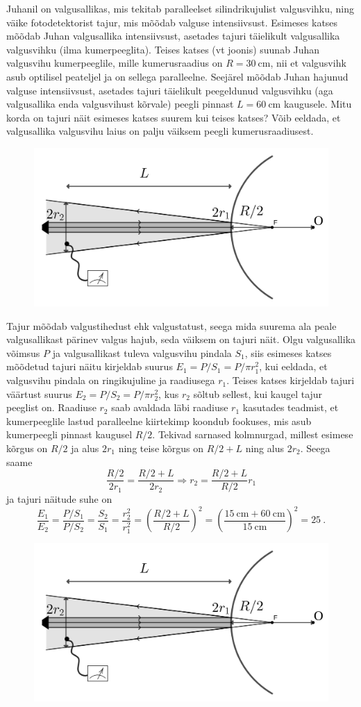 
Juhanil on valgusallikas, mis tekitab paralleelset silindrikujulist valgusvihku, ning väike fotodetektorist tajur, mis mõõdab valguse intensiivsust. Esimeses katses mõõdab Juhan valgusallika intensiivsust, asetades tajuri täielikult valgusallika valgusvihku (ilma kumerpeeglita). Teises katses (vt joonis) suunab Juhan valgusvihu kumerpeeglile, mille kumerusraadius on $R=\SI{30}{\centi\m}$, nii et valgusvihk asub optilisel peateljel ja on sellega paralleelne. Seejärel mõõdab Juhan hajunud valguse intensiivsust, asetades tajuri täielikult peegeldunud valgusvihku (aga valgusallika enda valgusvihust kõrvale) peegli pinnast $L=\SI{60}{\centi\m}$ kaugusele. Mitu korda on tajuri näit esimeses katses suurem kui teises katses? Võib eeldada, et valgusallika valgusvihu laius on palju väiksem peegli kumerusraadiusest.

\begin{figure}[h]
    \centering
    \includegraphics[width=0.6\linewidth]{2024-v2g-02-yl.png}
\end{figure}




\hint

\solu
Tajur mõõdab valgustihedust ehk valgustatust, seega mida suurema ala peale valgusallikast pärinev valgus hajub, seda väiksem on tajuri näit. Olgu valgusallika võimsus $P$ ja valgusallikast tuleva valgusvihu pindala $S_1$, siis esimeses katses mõõdetud tajuri näitu kirjeldab suurus $E_1 = P/S_1 = P/\pi r_1^2$, kui eeldada, et valgusvihu pindala on ringikujuline ja raadiusega $r_1$. Teises katses kirjeldab tajuri väärtust suurus $E_2 = P/S_2 = P/\pi r_2^2$, kus $r_2$ sõltub sellest, kui kaugel tajur peeglist on. Raadiuse $r_2$ saab avaldada läbi raadiuse $r_1$ kasutades teadmist, et kumerpeeglile lastud paralleelne kiirtekimp koondub fookuses, mis asub kumerpeegli pinnast kaugusel $R/2$. Tekivad sarnased kolmnurgad, millest esimese kõrgus on $R/2$ ja alus $2r_1$ ning teise kõrgus on $R/2 + L$ ning alus $2r_2$. Seega saame
$$ \frac{R/2}{2r_1} = \frac{R/2 + L}{2r_2} \Rightarrow r_2 = \frac{R/2 + L}{R/2} r_1$$
ja tajuri näitude suhe on
$$ \frac{E_1}{E_2} = \frac{P/S_1}{P/S_2} = \frac{S_2}{S_1} = \frac{r_2^2}{r_1^2} = \left(\frac{R/2 + L}{R/2}\right)^2 = \left(\frac{\SI{15}{\centi\meter} + \SI{60}{\centi\meter}}{\SI{15}{\centi\meter}}\right)^2 = 25 \ .$$

\begin{figure}[h]
    \centering
    \includegraphics[width=0.6\linewidth]{2024-v2g-02-yl.png}
\end{figure}
\probend